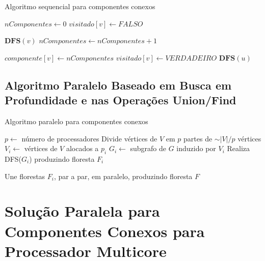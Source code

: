 \documentclass[12pt]{article}
\begin{document}
\begin{algorithm}
    \DontPrintSemicolon
    \caption{Algoritmo sequencial para componentes conexos}
	{
        $nComponentes \gets 0$\;
        {
            $visitado[v] \gets FALSO$\;
        }
    
        {
            {
                $\textbf{DFS}(v)$\;
                $nComponentes \gets nComponentes + 1$\;
            }
        }
    }
    
    {
        $componente[v] \gets nComponentes$\; 
        $visitado[v] \gets VERDADEIRO$\;
        {
            {
                $\textbf{DFS}(u)$\;
            }
        }
    }
\end{algorithm}

\subsection{Algoritmo Paralelo Baseado em Busca em Profundidade e nas Operações Union/Find}

{\color{gray}\lipsum[1]}

\begin{algorithm}
    \DontPrintSemicolon
    \caption{Algoritmo paralelo para componentes conexos}
    {
        $p \gets$ número de processadores\;
        Divide vértices de $V$ em $p$ partes de $\sim|V|/p$ vértices\;
        {
            $V_i \gets$ vértices de $V$ alocados a $p_i$\;
            $G_i \gets$ subgrafo de $G$ induzido por $V_i$\;
            Realiza DFS($G_i$) produzindo floresta $F_i$\;
        }

        Une florestas $F_i$, par a par, em paralelo, produzindo floresta $F$\;
        
    }
\end{algorithm}

\section{Solução Paralela para Componentes Conexos para Processador Multicore}
\end{document}
